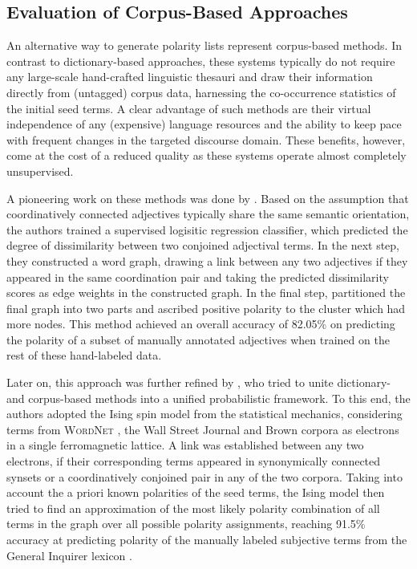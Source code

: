 
\subsection{Evaluation of Corpus-Based Approaches}

An alternative way to generate polarity lists represent corpus-based
methods.  In contrast to dictionary-based approaches, these systems
typically do not require any large-scale hand-crafted linguistic
thesauri and draw their information directly from (untagged) corpus
data, harnessing the co-occurrence statistics of the initial seed
terms.  A clear advantage of such methods are their virtual
independence of any (expensive) language resources and the ability to
keep pace with frequent changes in the targeted discourse domain.
These benefits, however, come at the cost of a reduced quality as
these systems operate almost completely unsupervised.

A pioneering work on these methods was done by \citet{Hatzivassi:97}.
Based on the assumption that coordinatively connected adjectives
typically share the same semantic orientation, the authors trained a
supervised logisitic regression classifier, which predicted the degree
of dissimilarity between two conjoined adjectival terms.  In the next
step, they constructed a word graph, drawing a link between any two
adjectives if they appeared in the same coordination pair and taking
the predicted dissimilarity scores as edge weights in the constructed
graph.  In the final step, \citet{Hatzivassi:97} partitioned the final
graph into two parts and ascribed positive polarity to the cluster
which had more nodes.  This method achieved an overall accuracy of
82.05\% on predicting the polarity of a subset of manually annotated
adjectives when trained on the rest of these hand-labeled data.

Later on, this approach was further refined by \citet{Takamura:05},
who tried to unite dictionary- and corpus-based methods into a unified
probabilistic framework.  To this end, the authors adopted the Ising
spin model from the statistical mechanics, considering terms from
\textsc{WordNet} \cite{Miller:95}, the Wall Street Journal and Brown
corpora as electrons in a single ferromagnetic lattice.  A link was
established between any two electrons, if their corresponding terms
appeared in synonymically connected synsets or a coordinatively
conjoined pair in any of the two corpora.  Taking into account the a
priori known polarities of the seed terms, the Ising model then tried
to find an approximation of the most likely polarity combination of
all terms in the graph over all possible polarity assignments,
reaching 91.5\% accuracy at predicting polarity of the manually
labeled subjective terms from the General Inquirer lexicon
\cite{Stone:66}.

